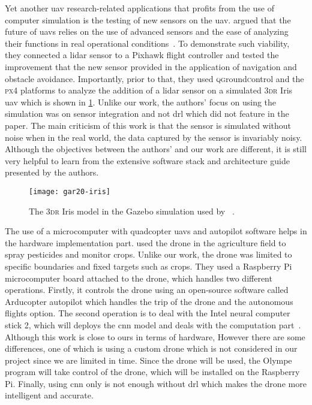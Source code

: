\documentclass[../main.tex]{subfiles}
\begin{document}
Yet another \gls{uav} research-related applications 
that profits from the use of computer simulation 
is the testing of new sensors on the \gls{uav}.
\citeauthor{Gar20} argued that the future of \glspl{uav}
relies on the use of advanced sensors and 
the ease of analyzing their functions
in real operational conditions~\cite{Gar20}.
To demonstrate such viability, they connected a \gls{lidar} sensor
to a Pixhawk flight controller and tested the improvement
that the new sensor provided
in the application of navigation and obstacle avoidance.
Importantly, prior to that, they used \textsc{qg}round\textsc{c}ontrol and the \textsc{px}4
platforms to analyze the addition of a \gls{lidar} sensor
on a simulated 3\textsc{dr} Iris \gls{uav} which is shown
in \cref{fig:gar20}.
Unlike our work, the authors' focus on using the simulation
was on sensor integration and not \gls{drl} 
which did not feature in the paper. 
The main criticism of this work is that 
the sensor is simulated without noise
when in the real world, the data captured
by the sensor is invariably noisy.
Although the objectives between the authors' and our work
are different, it is still very helpful to learn from
the extensive software stack and architecture guide 
presented by the authors.

\begin{figure}[tb] 
    \centering
    \texttt{[image: gar20-iris]} 
    \caption{The 3\textsc{dr} Iris model in the 
    Gazebo simulation used by 
    \citeauthor{Gar20}~\cite[Fig.~4]{Gar20}.} 
    \label{fig:gar20} 
\end{figure}



The use of a microcomputer with quadcopter \glspl{uav} and autopilot software helps in the hardware implementation part.
\citeauthor{Khan21} used the drone in the agriculture field to spray 
pesticides and monitor crops. Unlike our work, the drone was limited to specific
boundaries and fixed targets such as crops.
They used a Raspberry Pi microcomputer board attached to the drone, which handles two different operations. Firstly, it controls the drone using an open-source
software called Arducopter autopilot which  handles the trip of the drone and the autonomous 
flights option. The second operation is to deal with the Intel neural computer stick 2, which will deploys the \gls{cnn} model and deals with the computation part~\cite{Khan21}.
Although this work is close to ours in terms of hardware, However there are some differences, 
one of which is using a custom drone which is not considered in our project since we are limited in time.
Since the \anafi drone will be used, the Olympe program will take control of the drone, which will
be installed on the Raspberry Pi. Finally, using \gls{cnn} only is not enough without \gls{drl} 
which makes the drone more intelligent and accurate.
\end{document}
